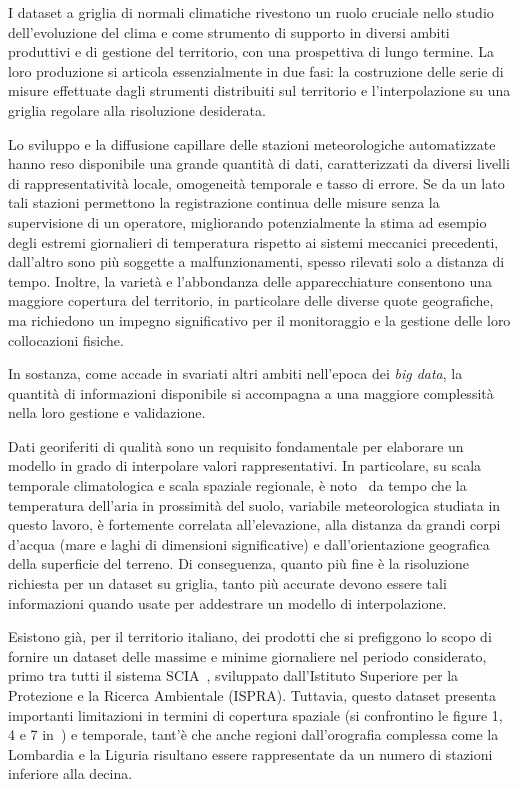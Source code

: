 I dataset a griglia di normali climatiche rivestono un ruolo cruciale nello studio dell’evoluzione del clima e come strumento di supporto in diversi ambiti produttivi e di gestione del territorio\cite{dalyGuidelinesAssessingSuitability2006}, con una prospettiva di lungo termine. La loro produzione si articola essenzialmente in due fasi: la costruzione delle serie di misure effettuate dagli strumenti distribuiti sul territorio e l'interpolazione su una griglia regolare alla risoluzione desiderata.

Lo sviluppo e la diffusione capillare delle stazioni meteorologiche automatizzate hanno reso disponibile una grande quantità di dati, caratterizzati da diversi livelli di rappresentatività locale, omogeneità temporale e tasso di errore. Se da un lato tali stazioni permettono la registrazione continua delle misure senza la supervisione di un operatore, migliorando potenzialmente la stima ad esempio degli estremi giornalieri di temperatura rispetto ai sistemi meccanici precedenti, dall'altro sono più soggette a malfunzionamenti, spesso rilevati solo a distanza di tempo. Inoltre, la varietà e l’abbondanza delle apparecchiature consentono una maggiore copertura del territorio, in particolare delle diverse quote geografiche, ma richiedono un impegno significativo per il monitoraggio e la gestione delle loro collocazioni fisiche.

In sostanza, come accade in svariati altri ambiti nell'epoca dei \emph{big data}, la quantità di informazioni disponibile si accompagna a una maggiore complessità nella loro gestione e validazione.

Dati georiferiti di qualità sono un requisito fondamentale per elaborare un modello in grado di interpolare valori rappresentativi. In particolare, su scala temporale climatologica e scala spaziale regionale, è noto~\cite{dalyKnowledgebasedApproachStatistical2002} da tempo che la temperatura dell'aria in prossimità del suolo, variabile meteorologica studiata in questo lavoro, è fortemente correlata all'elevazione, alla distanza da grandi corpi d'acqua (mare e laghi di dimensioni significative) e dall'orientazione geografica della superficie del terreno. Di conseguenza, quanto più fine è la risoluzione richiesta per un dataset su griglia, tanto più accurate devono essere tali informazioni quando usate per addestrare un modello di interpolazione.

Esistono già, per il territorio italiano, dei prodotti che si prefiggono lo scopo di fornire un dataset delle massime e minime giornaliere nel periodo considerato, primo tra tutti il sistema SCIA~\cite{desiatoSCIASystemBetter2007a}, sviluppato dall'Istituto Superiore per la Protezione e la Ricerca Ambientale (ISPRA). Tuttavia, questo dataset presenta importanti limitazioni in termini di copertura spaziale (si confrontino le figure 1, 4 e 7 in~\cite[pp.~12--15]{climnormISPRA2022}) e temporale, tant'è che anche regioni dall'orografia complessa come la Lombardia e la Liguria risultano essere rappresentate da un numero di stazioni inferiore alla decina.
